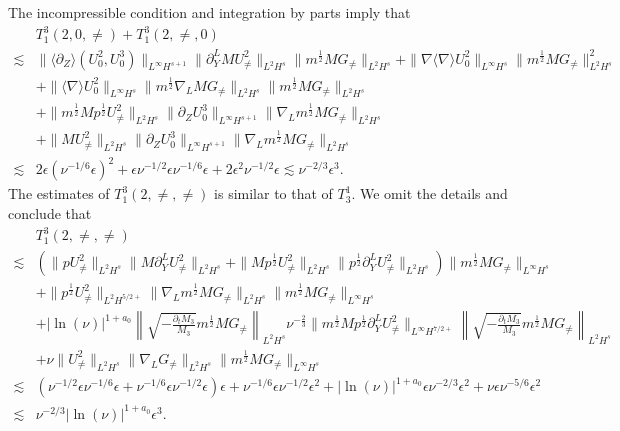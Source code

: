 \documentclass[12pt]{article}
\newcommand{\wtb}{\langle\partial_Z\rangle }
\numberwithin{equation}{section}
\begin{document}
	The incompressible condition and integration by parts imply that
	\begin{equation}\label{ineq-t41}
	    \begin{aligned}
		&T^3_1(2,0,\neq)+T^3_1(2,\neq,0)\\
		\lesssim&\|\wtb (U^2_0,U^3_0)\|_{L^{\infty} H^{s+1}}\|\partial_Y^LMU^2_{\neq}\|_{L^2H^s}\|m^{\frac{1}{2}}MG_{\neq}\|_{L^2H^s}+\|\nabla\langle \nabla\rangle U^2_{0}\|_{L^\infty H^s}\|m^{\frac{1}{2}}MG_{\neq}\|^2_{L^2H^s}\\
		&+\|\langle\nabla\rangle U^2_{0}\|_{L^\infty H^s}\|m^{\frac{1}{2}}\nabla_LMG_{\neq}\|_{L^2 H^s}\|m^{\frac{1}{2}}MG_{\neq}\|_{L^2H^s}\\
		&+\|m^{\frac{1}{2}}Mp^{\frac{1}{2}}U^2_{\neq}\|_{L^2H^s}\|\partial_ZU^3_0\|_{L^\infty H^{s+1}}\|\nabla_Lm^{\frac{1}{2}}MG_{\neq}\|_{L^2H^s}\\
		&+\|MU^2_{\neq}\|_{L^2H^s}\|\partial_ZU^3_0\|_{L^\infty H^{s+1}}\|\nabla_Lm^{\frac{1}{2}}MG_{\neq}\|_{L^2H^s}\\
		\lesssim&2\epsilon(\nu^{-1/6}\epsilon)^2+\epsilon\nu^{-1/2}\epsilon\nu^{-1/6}\epsilon+2\epsilon^2\nu^{-1/2}\epsilon\lesssim\nu^{-2/3}\epsilon^3.
	\end{aligned}
	\end{equation}
	The estimates of $T^3_1(2,\neq,\neq)$ is similar to that of $T^1_3$. We omit the details and conclude that
	\begin{align*}
		&T^3_1(2,\neq,\neq)\\
        \lesssim&(\|p U^2_{\neq}\|_{L^2H^s}\|M\partial_Y^LU^2_{\neq}\|_{L^2H^s}+\|M p^{\frac12} U^2_{\neq}\|_{L^2H^s}\|p^{\frac12} \partial_Y^L U^2_{\neq}\|_{L^2H^s})\|m^{\frac{1}{2}}MG_{\neq}\|_{L^\infty H^s}\\
		&+\|p^{\frac{1}{2}}U^2_{\neq}\|_{L^2H^{5/2+}}\|\nabla_Lm^{\frac{1}{2}}MG_{\neq}\|_{L^2H^s}\|m^{\frac{1}{2}}M G_{\neq}\|_{L^{\infty}H^{s}}\\
		&+|\ln(\nu)|^{1+a_0}\left\|\sqrt{-\frac{\partial_tM_3}{M_3}}m^{\frac{1}{2}}MG_{\neq}\right\|_{L^2H^s}\nu^{-\frac{2}{3}}\|m^{\frac12}M p^{\frac12} \partial_Y^L U^2_{\neq}\|_{L^{\infty}H^{7/2+}}\left\|\sqrt{-\frac{\partial_tM_3}{M_3}}m^{\frac{1}{2}}M G_{\neq}\right\|_{L^2H^{s}}\\
		&+\nu\| U^2_{\neq}\|_{L^2H^s}\|\nabla_LG_{\neq}\|_{L^2H^s}\|m^{\frac{1}{2}}M G_{\neq}\|_{L^{\infty} H^{s}}\\
		\lesssim&(\nu^{-1/2}\epsilon\nu^{-1/6}\epsilon+\nu^{-1/6}\epsilon\nu^{-1/2}\epsilon)\epsilon+\nu^{-1/6}\epsilon\nu^{-1/2}\epsilon^2+|\ln(\nu)|^{1+a_0}\epsilon\nu^{-2/3}\epsilon^2+\nu \epsilon\nu^{-5/6}\epsilon^2\\
		\lesssim&\nu^{-2/3}|\ln(\nu)|^{1+a_0}\epsilon^3.
	\end{align*}
\end{document}
